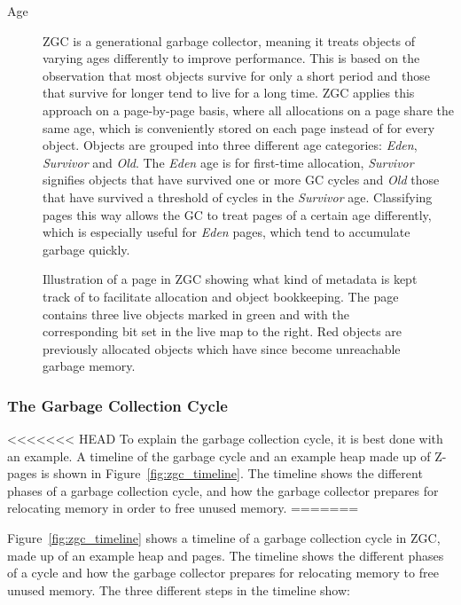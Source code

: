 \begin{description}
    \item[Age]
        ZGC is a generational garbage collector, meaning it treats objects of varying ages differently to improve performance. This is based on the observation that most objects survive for only a short period and those that survive for longer tend to live for a long time. ZGC applies this approach on a page-by-page basis, where all allocations on a page share the same age, which is conveniently stored on each page instead of for every object. Objects are grouped into three different age categories: \textit{Eden}, \textit{Survivor} and \textit{Old}. The \textit{Eden} age is for first-time allocation, \textit{Survivor} signifies objects that have survived one or more GC cycles and \textit{Old} those that have survived a threshold of cycles in the \textit{Survivor} age. Classifying pages this way allows the GC to treat pages of a certain age differently, which is especially useful for \textit{Eden} pages, which tend to accumulate garbage quickly.
\end{description}

\begin{figure}[H]
    \centering
    
    \caption{Illustration of a page in ZGC showing what kind of metadata is kept track of to facilitate allocation and object bookkeeping. The page contains three live objects marked in green and with the corresponding bit set in the live map to the right. Red objects are previously allocated objects which have since become unreachable garbage memory.} 
    \label{fig:zpages}
\end{figure}

\subsubsection{The Garbage Collection Cycle}
<<<<<<< HEAD
To explain the garbage collection cycle, it is best done with an example. A timeline of the garbage cycle and an example heap made up of Z-pages is shown in Figure~\ref{fig:zgc_timeline}. The timeline shows the different phases of a garbage collection cycle, and how the garbage collector prepares for relocating memory in order to free unused memory.
=======

Figure~\ref{fig:zgc_timeline} shows a timeline of a garbage collection cycle in ZGC, made up of an example heap and pages. The timeline shows the different phases of a cycle and how the garbage collector prepares for relocating memory to free unused memory. The three different steps in the timeline show:

